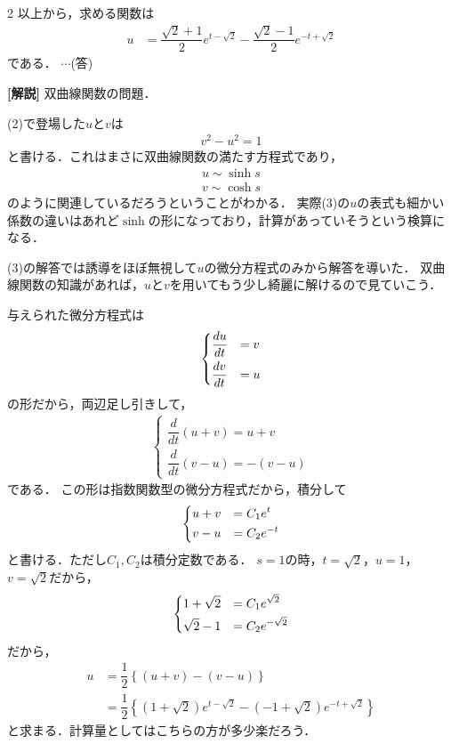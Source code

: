 \documentclass[../../main.tex]{subfiles}
\begin{document}
\begin{multicols}{2}
  以上から，求める関数は
  \begin{align}
    u & = \dfrac{\sqrt{2}+1}{2}e^{t-\sqrt{2}} - \dfrac{\sqrt{2}-1}{2}e^{-t+\sqrt{2}}
  \end{align}
  である．  $\cdots$(答)

  {\bf [解説]}
  双曲線関数の問題．

  (2)で登場した$u$と$v$は
  \begin{align}
    v^2-u^2 = 1
  \end{align}
  と書ける．これはまさに双曲線関数の満たす方程式であり，
  \begin{align}
    u \sim \sinh s \\
    v \sim \cosh s
  \end{align}
  のように関連しているだろうということがわかる．
  実際(3)の$u$の表式も細かい係数の違いはあれど$\sinh$の形になっており，計算があっていそうという検算になる．

  (3)の解答では誘導をほぼ無視して$u$の微分方程式のみから解答を導いた．
  双曲線関数の知識があれば，$u$と$v$を用いてもう少し綺麗に解けるので見ていこう．

  与えられた微分方程式は
  \begin{align}
    \begin{dcases}
      \dfrac{du}{dt} & =v \\
      \dfrac{dv}{dt} & =u
    \end{dcases}
  \end{align}
  の形だから，両辺足し引きして，
  \begin{align}
    \begin{cases}
      \dfrac{d}{dt}(u+v) = u+v \\
      \dfrac{d}{dt}(v-u) = -(v-u)
    \end{cases}
  \end{align}
  である．
  この形は指数関数型の微分方程式だから，積分して
  \begin{align}
    \begin{dcases}
      u+v & = C_1 e^t    \\
      v-u & = C_2 e^{-t}
    \end{dcases}
  \end{align}
  と書ける．ただし$C_1,C_2$は積分定数である．
  $s=1$の時，$t=\sqrt{2}$，$u=1$，$v=\sqrt{2}$だから，
  \begin{align}
    \begin{dcases}
      1+\sqrt{2} & = C_1 e^{\sqrt{2}}  \\
      \sqrt{2}-1 & = C_2 e^{-\sqrt{2}}
    \end{dcases}
  \end{align}
  だから，
  \begin{align}
    u
    & = \dfrac{1}{2} \left\{ (u+v) - (v-u) \right\}                                             \\
    & = \dfrac{1}{2} \left\{ (1+\sqrt{2})e^{t-\sqrt{2}} - (-1+\sqrt{2})e^{-t+\sqrt{2}} \right\}
  \end{align}
  と求まる．計算量としてはこちらの方が多少楽だろう．

  \newpage
\end{multicols}
\end{document}
